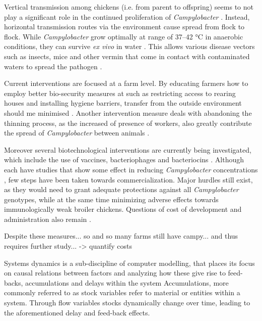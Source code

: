 Vertical transmission among chickens (i.e. from parent to offspring) seems to not play a significant role in the continued proliferation of \textit{Campylobacter} \parencite{callicott_lack_2006}. Instead, horizontal transmission routes via the environment cause spread from flock to flock. While \textit{Campylobacter} grow optimally at range of 37–42 °C in anaerobic conditions, they can survive \textit{ex vivo} in water \parencite{wilson_tracing_2008}. This allows various disease vectors such as insects, mice and other vermin that come in contact with contaminated waters to spread the pathogen \parencite{newell_sources_2003}.

Current interventions are focused at a farm level. By educating farmers how to employ better bio-security measures at such as restricting access to rearing houses and installing hygiene barriers, transfer from the outside environment should me minimised \parencite{hansson_knowledge_2018}. Another intervention measure deals with abandoning the thinning process, as the increased of presence of workers, also greatly contribute the spread of \textit{Campylobacter} between animals \parencite{lin_novel_2009}. 

Moreover several biotechnological interventions are currently being investigated, which include the use of vaccines, bacteriophages and bacteriocins \parencite{hansson_knowledge_2018}. Although each have studies that show some effect in reducing \textit{Campylobacter} concentrations \parencite{wagenaar_phage_2005}, few steps have been taken towards commercialization. Major hurdles still exist, as they would need to grant adequate protections against all \textit{Campylobacter} genotypes, while at the same time minimizing adverse effects towards immunologically weak broiler chickens. Questions of cost of development and administration also remain \parencite{hansson_knowledge_2018}.

Despite these measures... so and so many farms still have campy... and thus requires further study...
-> quantify costs


Systems dynamics is a sub-discipline of computer modelling, that places its focus on causal relations between factors and analyzing how these give rise to feed-backs, accumulations and delays within the system \parencite{} Accumulations, more commonly referred to as stock variables refer to material or entities within a system. Through flow variables stocks dynamically change over time, leading to the aforementioned delay and feed-back effects. 

